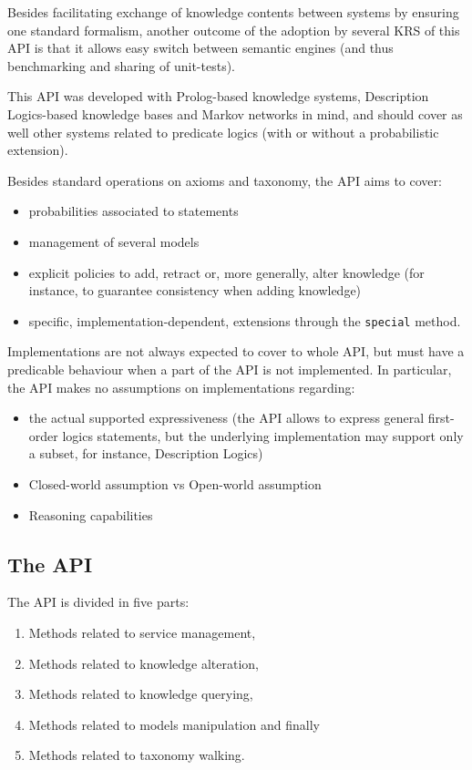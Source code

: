 Besides facilitating exchange of knowledge contents between systems by ensuring
one standard formalism, another outcome of the adoption by several KRS of this
API is that it allows easy switch between semantic engines (and thus
benchmarking and sharing of unit-tests).

This API was developed with Prolog-based knowledge systems, Description
Logics-based knowledge bases and Markov networks in mind, and should cover as
well other systems related to predicate logics (with or without a probabilistic
extension).

Besides standard operations on axioms and taxonomy, the API aims to cover:

\begin{itemize}
    \item  probabilities associated to statements
    \item  management of several models
    \item  explicit policies to add, retract or, more generally, alter 
    knowledge (for instance, to guarantee consistency when adding knowledge)
    \item  specific, implementation-dependent, extensions through the
    \texttt{special} method.
\end{itemize}

Implementations are not always expected to cover to whole API, but must have a
predicable behaviour when a part of the API is not implemented. In particular,
the API makes no assumptions on implementations regarding:

\begin{itemize}
    \item  the actual supported expressiveness (the API allows to express
    general first-order logics statements, but the underlying implementation
    may support only a subset, for instance, Description Logics)
    \item  Closed-world assumption vs Open-world assumption
    \item  Reasoning capabilities
\end{itemize}

\subsection{The API}

The API is divided in five parts:
\begin{enumerate}
    \item Methods related to service management,
    \item Methods related to knowledge alteration,
    \item Methods related to knowledge querying,
    \item Methods related to models manipulation and finally
    \item Methods related to taxonomy walking.
\end{enumerate}


